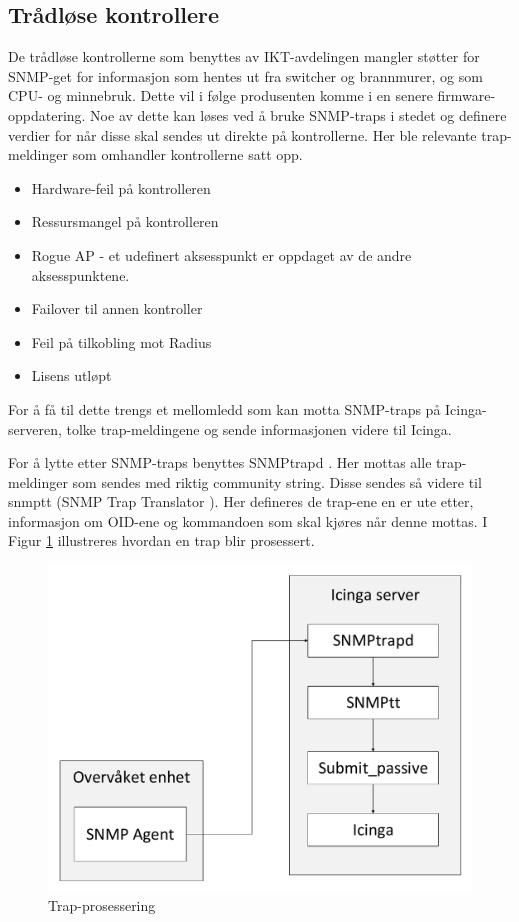 \subsection{Trådløse kontrollere}
De trådløse kontrollerne som benyttes av IKT-avdelingen mangler støtter for SNMP-get for informasjon som hentes ut fra switcher og brannmurer, og som CPU- og minnebruk. Dette vil i følge produsenten komme i en senere firmware-oppdatering. Noe av dette kan løses ved å bruke SNMP-traps i stedet og definere verdier for når disse skal sendes ut direkte på kontrollerne. Her ble relevante trap-meldinger som omhandler kontrollerne satt opp.

\begin{itemize}
	\item Hardware-feil på kontrolleren
	\item Ressursmangel på kontrolleren
	\item Rogue AP - et udefinert aksesspunkt er oppdaget av de andre aksesspunktene.
	\item Failover til annen kontroller
	\item Feil på tilkobling mot Radius
	\item Lisens utløpt
\end{itemize}

For å få til dette trengs et mellomledd som kan motta SNMP-traps på Icinga-serveren, tolke trap-meldingene og sende informasjonen videre til Icinga. 

For å lytte etter SNMP-traps benyttes SNMPtrapd \cite{snmptraps2}. Her mottas alle trap-meldinger som sendes med riktig community string. Disse sendes så videre til snmptt (SNMP Trap Translator \cite{traptranselator}). Her defineres de trap-ene en er ute etter, informasjon om OID-ene og kommandoen som skal kjøres når denne mottas. I Figur \ref{snmptrap} illustreres hvordan en trap blir prosessert. 

\begin{figure}[H]
    \centering
    \includegraphics[scale=0.4]{img/SNMPtrap}
    \caption{Trap-prosessering}
    \label{snmptrap}
\end{figure}

